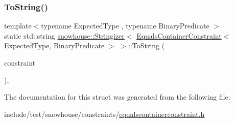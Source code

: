 \subsubsection{\texorpdfstring{ToString()}{ToString()}}
{\footnotesize\ttfamily template$<$typename Expected\+Type , typename Binary\+Predicate $>$ \\
static std\+::string \mbox{\hyperlink{structsnowhouse_1_1Stringizer}{snowhouse\+::\+Stringizer}}$<$ \mbox{\hyperlink{structsnowhouse_1_1EqualsContainerConstraint}{Equals\+Container\+Constraint}}$<$ Expected\+Type, Binary\+Predicate $>$ $>$\+::To\+String (\begin{DoxyParamCaption}\item[{const \mbox{\hyperlink{structsnowhouse_1_1EqualsContainerConstraint}{Equals\+Container\+Constraint}}$<$ Expected\+Type, Binary\+Predicate $>$ \&}]{constraint }\end{DoxyParamCaption})\hspace{0.3cm}{\ttfamily [inline]}, {\ttfamily [static]}}



The documentation for this struct was generated from the following file\+:\begin{DoxyCompactItemize}
\item 
include/test/snowhouse/constraints/\mbox{\hyperlink{equalscontainerconstraint_8h}{equalscontainerconstraint.\+h}}\end{DoxyCompactItemize}
